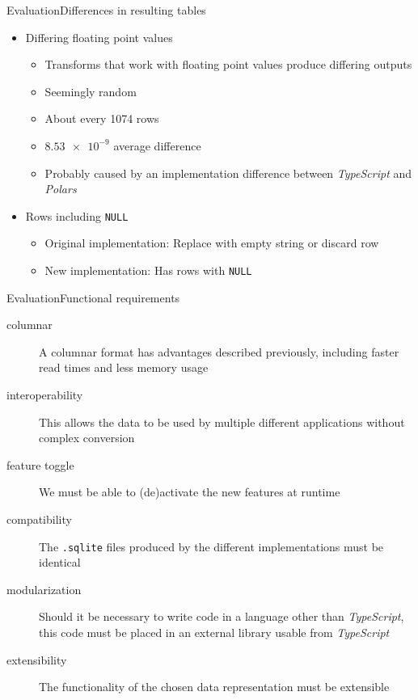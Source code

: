 \begin{frame}[t]{Evaluation}{Differences in resulting tables}
	\begin{itemize}
		\item Differing floating point values
		      \begin{itemize}
			      \item Transforms that work with floating point values produce differing outputs
			      \item Seemingly random
			      \item About every 1074 rows
			      \item $\num{8.53e-9}$ average difference
			      \item Probably caused by an implementation difference between \emph{TypeScript} and \emph{Polars}
		      \end{itemize}
		\item Rows including \Verb|NULL|
		      \begin{itemize}
			      \item Original implementation: Replace with empty string or discard row
			      \item New implementation: Has rows with \Verb|NULL|
		      \end{itemize}
	\end{itemize}

\end{frame}

\begin{frame}[t]{Evaluation}{Functional requirements}
	\begin{description}
		\item[columnar] A columnar format has advantages described previously, including faster read times and less memory usage \uncover<2->{({\color{green} \checkmark})}
		\item[interoperability] This allows the data to be used by multiple different applications without complex conversion \uncover<3->{({\color{green} \checkmark})}
		\item[feature toggle] We must be able to (de)activate the new features at runtime \uncover<4->{({\color{green} \checkmark})}
		\item[compatibility] The \Verb|.sqlite| files produced by the different implementations must be identical \uncover<5->{({\color{red} \xmark})}
		\item[modularization] Should it be necessary to write code in a language other than \emph{TypeScript}, this code must be placed in an external library usable from \emph{TypeScript} \uncover<6->{({\color{green} \checkmark})}
		\item[extensibility] The functionality of the chosen data representation must be extensible \uncover<7->{({\color{green} \checkmark})}
	\end{description}
\end{frame}

